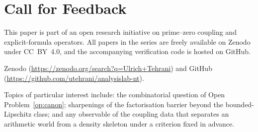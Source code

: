 \documentclass[11pt]{article}
\begin{document}
\section*{Call for Feedback}

This paper is part of an open research initiative on prime--zero
coupling and explicit-formula operators.
All papers in the series are freely available on Zenodo under CC~BY~4.0, and
the accompanying verification code is hosted on GitHub.

{\sloppy
Zenodo (\url{https://zenodo.org/search?q=Ulrich+Tehrani}) and GitHub
(\url{https://github.com/utehrani/analysislab-nt}).
\par}

Topics of particular interest include: the combinatorial question of
Open Problem~\ref{op:canon}; sharpenings of the factorisation barrier beyond
the bounded-Lipschitz class; and any observable of the coupling data that
separates an arithmetic world from a density skeleton under a criterion fixed
in advance.
\end{document}
